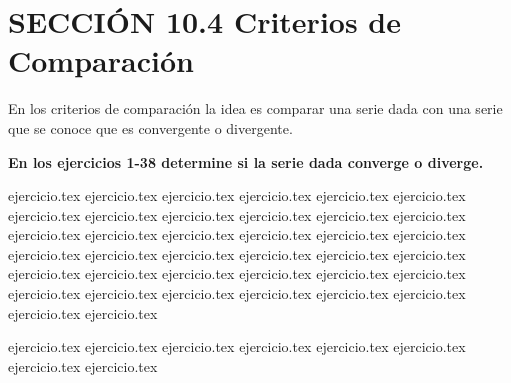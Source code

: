 
\section*{SECCIÓN 10.4 \quad Criterios de Comparación}

En los criterios de comparación la idea es comparar una serie dada con una serie que se conoce que es convergente o divergente.

\vspace{0.5cm}
\noindent\textbf{En los ejercicios 1-38 determine si la serie dada converge o diverge.}
\begin{enumerate}
    {ejercicio.tex}
{ejercicio.tex}
{ejercicio.tex}
{ejercicio.tex}
{ejercicio.tex}
{ejercicio.tex}
{ejercicio.tex}
{ejercicio.tex}
{ejercicio.tex}
{ejercicio.tex}
{ejercicio.tex}
{ejercicio.tex}
{ejercicio.tex}
{ejercicio.tex}
{ejercicio.tex}
{ejercicio.tex}
{ejercicio.tex}
{ejercicio.tex}
{ejercicio.tex}
{ejercicio.tex}
{ejercicio.tex}
{ejercicio.tex}
{ejercicio.tex}
{ejercicio.tex}
{ejercicio.tex}
{ejercicio.tex}
{ejercicio.tex}
{ejercicio.tex}
{ejercicio.tex}
{ejercicio.tex}
{ejercicio.tex}
{ejercicio.tex}
{ejercicio.tex}
{ejercicio.tex}
{ejercicio.tex}
{ejercicio.tex}
{ejercicio.tex}
{ejercicio.tex}
\end{enumerate}

\vspace{0.5cm}
\begin{enumerate}
    \setcounter{enumi}{38}
    {ejercicio.tex}
{ejercicio.tex}
{ejercicio.tex}
{ejercicio.tex}
{ejercicio.tex}
{ejercicio.tex}
{ejercicio.tex}
{ejercicio.tex}
\end{enumerate}
